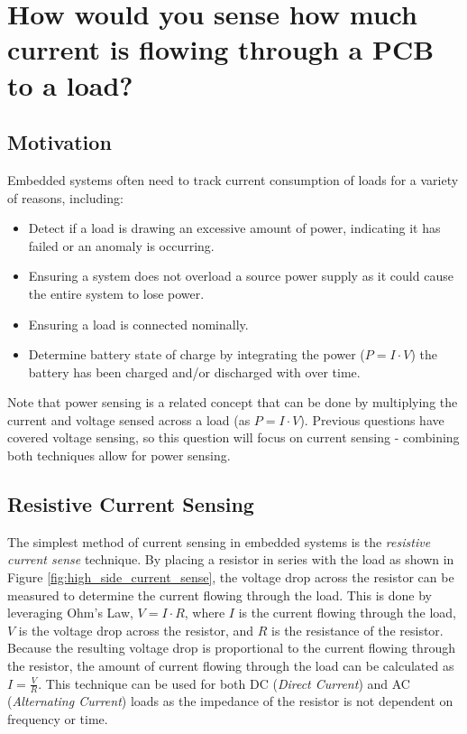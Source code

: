 \documentclass[main.tex]{subfiles}
\begin{document}
\section{How would you sense how much current is flowing through a PCB to a load?}


\spoilerline

\subsection{Motivation}
Embedded systems often need to track current consumption of loads for a variety of reasons, including:
\begin{itemize}
    \item Detect if a load is drawing an excessive amount of power, indicating it has failed or an anomaly is occurring. 
    \item Ensuring a system does not overload a source power supply as it could cause the entire system to lose power. 
    \item Ensuring a load is connected nominally.
    \item Determine battery state of charge by integrating the power ($P = I \cdot V$) the battery has been charged and/or discharged with over time.
\end{itemize}

\noindent Note that power sensing is a related concept that can be done by multiplying the current and voltage sensed across a load (as $P = I \cdot V$). Previous questions have covered voltage sensing, so this question will focus on current sensing - combining both techniques allow for power sensing.

\subsection{Resistive Current Sensing}
The simplest method of current sensing in embedded systems is the \textit{resistive current sense} technique. By placing a resistor in series with the load as shown in Figure \ref{fig:high_side_current_sense}, the voltage drop across the resistor can be measured to determine the current flowing through the load. This is done by leveraging Ohm's Law, $V = I \cdot R$, where $I$ is the current flowing through the load, $V$ is the voltage drop across the resistor, and $R$ is the resistance of the resistor. Because the resulting voltage drop is proportional to the current flowing through the resistor, the amount of current flowing through the load can be calculated as $I = \frac{V}{R}$. This technique can be used for both DC (\textit{Direct Current}) and AC (\textit{Alternating Current}) loads as the impedance of the resistor is not dependent on frequency or time.
\end{document}
